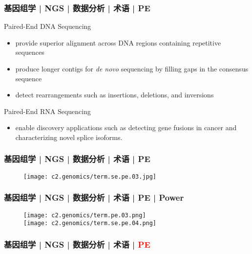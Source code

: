 \begin{frame}
  \frametitle{基因组学 | NGS | 数据分析 | 术语 | PE}
  \begin{block}{Paired-End DNA Sequencing}
    \begin{itemize}
      \item provide superior alignment across DNA regions containing repetitive sequences
      \item produce longer contigs for \textit{de novo} sequencing by filling gaps in the consensus sequence
      \item detect rearrangements such as insertions, deletions, and inversions
    \end{itemize}
  \end{block}
  \pause
  \begin{block}{Paired-End RNA Sequencing}
    \begin{itemize}
      \item enable discovery applications such as detecting gene fusions in cancer and characterizing novel splice isoforms.
    \end{itemize}
  \end{block}
\end{frame}

\begin{frame}
  \frametitle{基因组学 | NGS | 数据分析 | 术语 | PE}
  \begin{figure}
    \centering
    \texttt{[image: c2.genomics/term.se.pe.03.jpg]}
  \end{figure}
\end{frame}

\begin{frame}
  \frametitle{基因组学 | NGS | 数据分析 | 术语 | PE | Power}
  \begin{figure}
    \centering
    \texttt{[image: c2.genomics/term.pe.03.png]}\\
    \vspace{1em}
    \texttt{[image: c2.genomics/term.se.pe.04.png]}
  \end{figure}
\end{frame}

\begin{frame}
  \frametitle{基因组学 | NGS | 数据分析 | 术语 | \textcolor{red}{PE}}
  \begin{figure}
    \centering
    \\
    \vspace{1em}
  \end{figure}
\end{frame}

